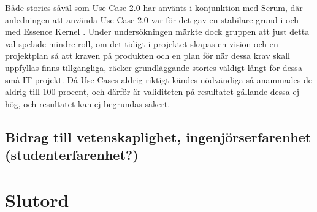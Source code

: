 \documentclass[conference,a4paper]{IEEEtran}
\begin{document}
Både stories såväl som Use-Case 2.0 har använts i konjunktion med Scrum, där anledningen att använda Use-Case 2.0 var för det gav en stabilare grund i och med Essence Kernel \cite{Jacobson11}. Under undersökningen märkte dock gruppen att just detta val spelade mindre roll, om det tidigt i projektet skapas en vision och en projektplan så att kraven på produkten och en plan för när dessa krav skall uppfyllas finns tillgängliga, räcker grundläggande stories väldigt långt för dessa små IT-projekt. Då Use-Cases aldrig riktigt kändes nödvändiga så anammades de aldrig till 100 procent, och därför är validiteten på resultatet gällande dessa ej hög, och resultatet kan ej begrundas säkert.

\subsection{Bidrag till vetenskaplighet, ingenjörserfarenhet (studenterfarenhet?)}

\section{Slutord} \label{sec:slutord}



%
%
%


\end{document}
